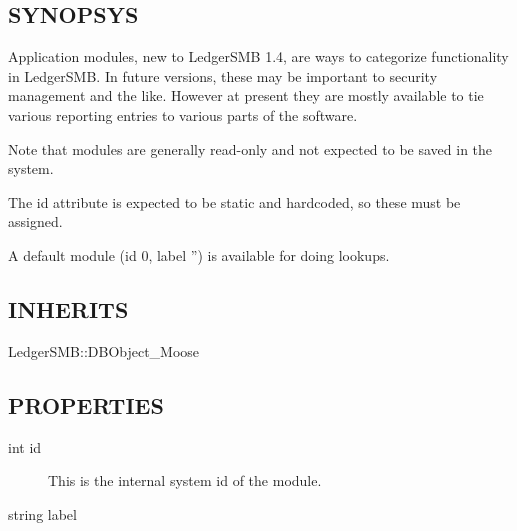 \begin{description}
\begin{description}
\begin{description}
\begin{description}
\begin{description}
\begin{description}
\begin{description}
\begin{description}
\begin{description}
\begin{description}
\subsection*{SYNOPSYS\label{LedgerSMB::DBObject::App_Module_-_-_Application_Module_Lists_for_LedgerSMB_SYNOPSYS}}


Application modules, new to LedgerSMB 1.4, are ways to categorize functionality in 
LedgerSMB.  In future versions, these may be important to security management and the
like.  However at present they are mostly available to tie various reporting entries
to various parts of the software.



Note that modules are generally read-only and not expected to be saved in the system.



The id attribute is expected to be static and hardcoded, so these must be assigned.



A default module (id 0, label '') is available for doing lookups.

\subsection*{INHERITS\label{LedgerSMB::DBObject::App_Module_-_-_Application_Module_Lists_for_LedgerSMB_INHERITS}}
\begin{description}

\item[{LedgerSMB::DBObject\_Moose}] \mbox{}\end{description}
\subsection*{PROPERTIES\label{LedgerSMB::DBObject::App_Module_-_-_Application_Module_Lists_for_LedgerSMB_PROPERTIES}}
\begin{description}

\item[{int id}] \mbox{}

This is the internal system id of the module.


\item[{string label}] \mbox{}


\end{description}
\end{description}
\end{description}
\end{description}
\end{description}
\end{description}
\end{description}
\end{description}
\end{description}
\end{description}
\end{description}
